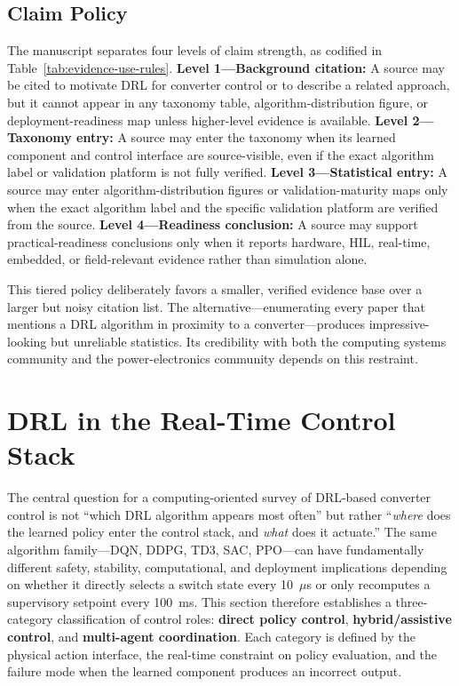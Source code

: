 \documentclass[manuscript,screen,review]{acmart}
\begin{document}
\subsection{Claim Policy}

The manuscript separates four levels of claim strength, as codified in Table~\ref{tab:evidence-use-rules}.
\textbf{Level 1---Background citation:} A source may be cited to motivate DRL for converter control or to describe a related approach, but it cannot appear in any taxonomy table, algorithm-distribution figure, or deployment-readiness map unless higher-level evidence is available.
\textbf{Level 2---Taxonomy entry:} A source may enter the taxonomy when its learned component and control interface are source-visible, even if the exact algorithm label or validation platform is not fully verified.
\textbf{Level 3---Statistical entry:} A source may enter algorithm-distribution figures or validation-maturity maps only when the exact algorithm label and the specific validation platform are verified from the source.
\textbf{Level 4---Readiness conclusion:} A source may support practical-readiness conclusions only when it reports hardware, HIL, real-time, embedded, or field-relevant evidence rather than simulation alone.

This tiered policy deliberately favors a smaller, verified evidence base over a larger but noisy citation list.
The alternative---enumerating every paper that mentions a DRL algorithm in proximity to a converter---produces impressive-looking but unreliable statistics.
Its credibility with both the computing systems community and the power-electronics community depends on this restraint.

\section{DRL in the Real-Time Control Stack}
\label{sec:control-stack}

The central question for a computing-oriented survey of DRL-based converter control is not ``which DRL algorithm appears most often'' but rather ``\emph{where} does the learned policy enter the control stack, and \emph{what} does it actuate.''
The same algorithm family---DQN, DDPG, TD3, SAC, PPO---can have fundamentally different safety, stability, computational, and deployment implications depending on whether it directly selects a switch state every 10~$\mu$s or only recomputes a supervisory setpoint every 100~ms.
This section therefore establishes a three-category classification of control roles: \textbf{direct policy control}, \textbf{hybrid/assistive control}, and \textbf{multi-agent coordination}.
Each category is defined by the physical action interface, the real-time constraint on policy evaluation, and the failure mode when the learned component produces an incorrect output.
\end{document}
